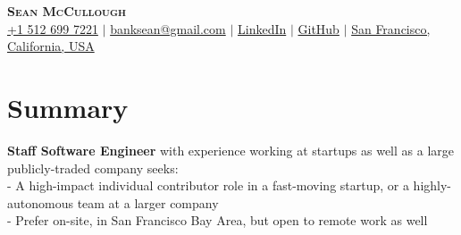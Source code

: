 \documentclass[letterpaper,11pt]{article}
\newcommand{\faMobile}{}
\newcommand{\faAt}{}
\newcommand{\faLinkedinSquare}{}
\newcommand{\faGithub}{}
\newcommand{\faMapMarker}{}
\newcommand{\resumeSubHeadingListStart}{\begin{itemize}[leftmargin=0.15in, label={}]}
\newcommand{\resumeSubHeadingListEnd}{\end{itemize}}
\begin{document}

\begin{center}
    \textbf{\Huge \scshape Sean McCullough} \\ \vspace{3pt}
    \small
    \faMobile \hspace{.5pt} \href{tel:15126997221}{+1 512 699 7221}
    $|$
    \faAt \hspace{.5pt} \href{mailto:banksean@gmail.com}{banksean@gmail.com}
    $|$
    \faLinkedinSquare \hspace{.5pt} \href{https://www.linkedin.com/in/seanmccullough/}{LinkedIn}
    $|$
    \faGithub \hspace{.5pt} \href{https://github.com/banksean}{GitHub}
    $|$
    \faMapMarker \hspace{.5pt} \href{https://maps.app.goo.gl/qZ2iPhKzdnsEXERw8}{San Francisco, California, USA}
\end{center}


\section{Summary}
\vspace{2pt}
\resumeSubHeadingListStart
  \small{\item{
      \textbf{Staff Software Engineer}{ with experience working at startups as well as a large publicly-traded company seeks:} \\ \vspace{3pt}
      \textbf{}{- A high-impact individual contributor role in a fast-moving startup, or a highly-autonomous team at a larger company} \\ \vspace{3pt}
      \textbf{}{- Prefer on-site, in San Francisco Bay Area, but open to remote work as well}
  }}
\resumeSubHeadingListEnd


\end{document}

